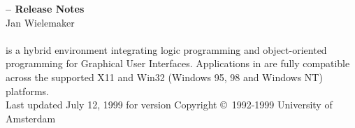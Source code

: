 \titlepageheader
\vfil

\noindent
{\bf \product{}--\productversion{} Release Notes} \\[2cm]
Jan Wielemaker \\
 \\
\vfil
\noindent
\productpl{} is a hybrid environment integrating logic programming and
object-oriented programming for Graphical User Interfaces.  Applications
in \productpl{} are fully compatible across the supported X11 and
Win32 (Windows 95, 98 and Windows NT) platforms.\\[10pt]
\vfil\vfil
\noindent
Last updated July 12, 1999 for \product{} version \productversion
\vfil
\noindent
Copyright \copyright\ 1992-1999 University of Amsterdam
